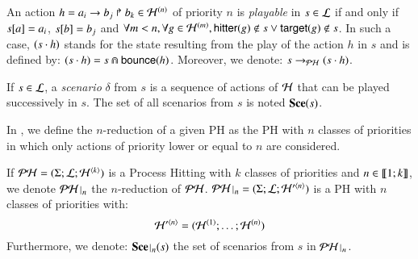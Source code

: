 \begin{definition}
\label{def:play}
  An action $h = a_i\rightarrow b_j\Rsh b_k \in \mathcal{H}^{(n)}$ of priority $n$ is \emph{playable} in $s \in \mathcal{L}$
  if and only if ${s[a]} = a_i$, ${s[b]} = b_j$ and $\forall m < n, \forall g \in \mathcal{H}^{(m)}, \mathsf{hitter}(g) \notin s \vee \mathsf{target}(g) \notin s$.
  In such a case, $(s \cdot h)$ stands for the state resulting from the play of the action $h$ in $s$ and is defined by: $(s \cdot h) = s \Cap \mathsf{bounce}(h)$.
  Moreover, we denote: $s \rightarrow_{\mathcal{PH}} (s \cdot h)$.

  If $s \in \mathcal{L}$,
  a \emph{scenario} $\delta$ from $s$ is a sequence of actions of $\mathcal{H}$ that can be played successively in $s$.
  The set of all scenarios from $s$ is noted $\mathbf{Sce}(s)$.
\end{definition}

In , we define the $n$-reduction of a given PH as the PH with $n$ classes of priorities in which only actions of priority lower or equal to $n$ are considered.
\begin{definition}[PH $n$-reduction]
\label{def:restriction}
  If $\mathcal{PH} = (\Sigma; \mathcal{L}; \mathcal{H}^{\langle k \rangle})$ is a Process Hitting with $k$ classes of priorities and $n \in \llbracket 1; k \rrbracket$, we denote $\restriction{\PH}{n}$
  the $n$-reduction of $\mathcal{PH}$.
  $\restriction{\PH}{n} = (\PHs; \PHl; \PHa'^{\langle n \rangle})$ is a PH with $n$ classes of priorities with:
  $$\mathcal{H}'^{\langle n \rangle} = (\mathcal{H}^{(1)}; \dots; \mathcal{H}^{(n)})$$
  Furthermore, we denote: $\restriction{\Sce}{n}(s)$ the set of scenarios from $s$ in $\restriction{\PH}{n}$.
\end{definition}




